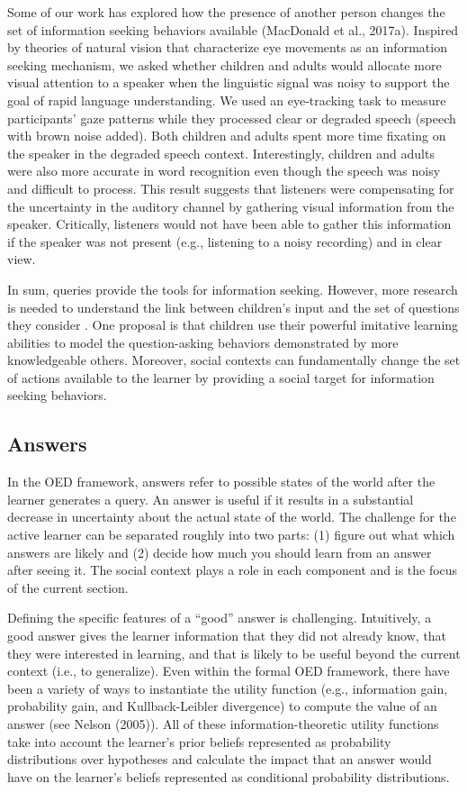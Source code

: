 \documentclass[oneside]{report}
\begin{document}
Some of our work has explored how the presence of another person changes
the set of information seeking behaviors available (MacDonald et al.,
2017a). Inspired by theories of natural vision that characterize eye
movements as an information seeking mechanism, we asked whether children
and adults would allocate more visual attention to a speaker when the
linguistic signal was noisy to support the goal of rapid language
understanding. We used an eye-tracking task to measure participants'
gaze patterns while they processed clear or degraded speech (speech with
brown noise added). Both children and adults spent more time fixating on
the speaker in the degraded speech context. Interestingly, children and
adults were also more accurate in word recognition even though the
speech was noisy and difficult to process. This result suggests that
listeners were compensating for the uncertainty in the auditory channel
by gathering visual information from the speaker. Critically, listeners
would not have been able to gather this information if the speaker was
not present (e.g., listening to a noisy recording) and in clear view.

In sum, queries provide the tools for information seeking. However, more
research is needed to understand the link between children's input and
the set of questions they consider . One proposal is that children use
their powerful imitative learning abilities to model the question-asking
behaviors demonstrated by more knowledgeable others. Moreover, social
contexts can fundamentally change the set of actions available to the
learner by providing a social target for information seeking behaviors.

\hypertarget{answers}{%
\subsection{Answers}\label{answers}}

In the OED framework, answers refer to possible states of the world
after the learner generates a query. An answer is useful if it results
in a substantial decrease in uncertainty about the actual state of the
world. The challenge for the active learner can be separated roughly
into two parts: (1) figure out what which answers are likely and (2)
decide how much you should learn from an answer after seeing it. The
social context plays a role in each component and is the focus of the
current section.

Defining the specific features of a ``good'' answer is challenging.
Intuitively, a good answer gives the learner information that they did
not already know, that they were interested in learning, and that is
likely to be useful beyond the current context (i.e., to generalize).
Even within the formal OED framework, there have been a variety of ways
to instantiate the utility function (e.g., information gain, probability
gain, and Kullback-Leibler divergence) to compute the value of an answer
(see Nelson (2005)). All of these information-theoretic utility
functions take into account the learner's prior beliefs represented as
probability distributions over hypotheses and calculate the impact that
an answer would have on the learner's beliefs represented as conditional
probability distributions.
\end{document}

